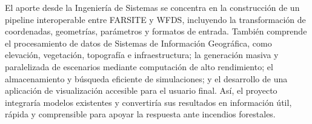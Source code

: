 El aporte desde la Ingeniería de Sistemas se concentra en la construcción de un pipeline interoperable entre FARSITE y WFDS, incluyendo la transformación de coordenadas, geometrías, parámetros y formatos de entrada. También comprende el procesamiento de datos de Sistemas de Información Geográfica, como elevación, vegetación, topografía e infraestructura; la generación masiva y paralelizada de escenarios mediante computación de alto rendimiento; el almacenamiento y búsqueda eficiente de simulaciones; y el desarrollo de una aplicación de visualización accesible para el usuario final. Así, el proyecto integraría modelos existentes y convertiría sus resultados en información útil, rápida y comprensible para apoyar la respuesta ante incendios forestales.
